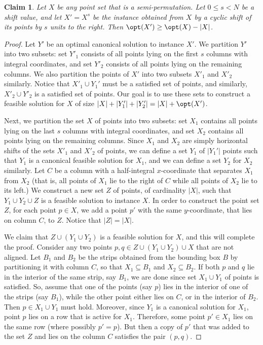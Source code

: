 \documentclass[11pt]{article}
\numberwithin{equation}{section}
\newtheorem{claim}[theorem]{Claim}
\theoremstyle{definition}
\theoremstyle{plain}
\begin{document}
\begin{claim}\label{claim: shifting does not hurt opt}
Let $X$ be any point set that is a semi-permutation. Let $0\leq s<N$ be a shift value, and let $X'=X^s$ be the instance obtained from $X$ by a cyclic shift of its points by $s$ units to the right. 
Then $\opt(X')\geq \opt(X)-|X|$.
\end{claim}
\begin{proof}

Let $Y'$ be an optimal canonical solution to instance $X'$. 
We partition $Y'$ into two subsets: set $Y'_1$ consists of all points lying on the first $s$ columns with integral coordinates, and set $Y'_2$ consists of all points lying on the remaining columns. 
We also partition the points of $X'$ into two subsets $X'_1$ and $X'_2$ similarly.  Notice that $X'_1\cup Y_1'$ must be a satisfied set of points, and similarly, $X'_2\cup Y'_2$ is a satisfied set of points.
Our goal is to use these sets to construct a feasible solution for $X$ of size $|X|+|Y'_1| + |Y'_2| = |X|+\opt(X')$.
	
Next, we partition the set $X$ of points into two subsets: set $X_1$ contains all points lying on the last $s$ columns with integral coordinates, and set $X_2$ contains all points lying on the remaining columns. 
Since $X_1$ and $X_2$ are simply horizontal shifts of the sets $X'_1$ and $X'_2$ of points, we can define a set $Y_1$ of $|Y_1'|$ points such that $Y_1$ is a canonical feasible solution for $X_1$, and we can define a set $Y_2$ for $X_2$ similarly. 
%
Let $C$ be a column with a half-integral $x$-coordinate that separates $X_1$ from $X_2$ (that is, all points of $X_1$ lie to the right of $C$ while all points of $X_2$ lie to its left.) We construct a new set $Z$ of points, of cardinality $|X|$, such that $Y_1\cup Y_2\cup Z$ is a feasible solution to instance $X$. In order to construct the point set $Z$,
for each point $p \in X$, we add a point $p'$ with the same $y$-coordinate, that lies on column $C$, to $Z$. Notice that $|Z|=|X|$.

 
We claim that $Z \cup (Y_1 \cup Y_2)$ is a feasible solution  for $X$, and this will complete the proof.  
Consider any two points $p,q \in Z \cup (Y_1 \cup Y_2) \cup X$ that are not aligned.
Let $B_1$ and $B_2$ be the strips obtained from the bounding box $B$ by partitioning it with column $C$, so that $X_1\subseteq B_1$ and $X_2\subseteq B_2$. 
If both $p$ and $q$ lie in the interior of the same strip, say $B_1$, we are done since set $X_1\cup Y_1$ of points is satisfied.
So, assume that  one of the points (say $p$) lies in the interior of one of the strips (say $B_1$), while the other point either lies on $C$, or in the interior of $B_2$. Then $p\in X_1\cup Y_1$ must hold. Moreover, since $Y_1$ is a canonical solution for $X_1$, point $p$ lies on a row that is active for $X_1$. Therefore, some point $p'\in X_1$ lies on the same row (where possibly $p'=p$). But then a copy of $p'$ that was added to the set $Z$ and lies on the column $C$ satisfies the pair $(p,q)$.     
\end{proof}
\end{document}
